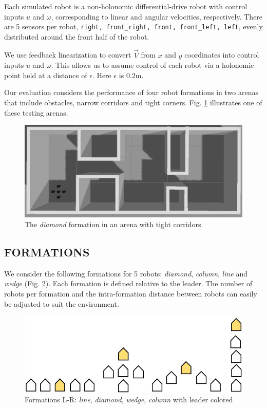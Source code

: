 \documentclass[letterpaper, 10 pt, conference]{ieeeconf}  %
\begin{document}
Each simulated robot is a non-holonomic differential-drive robot with control inputs $u$ and $\omega$, corresponding to linear and angular velocities, respectively. There are 5 sensors per robot, \texttt{right, front\_right, front, front\_left, left}, evenly distributed around the front half of the robot.

We use feedback linearization to convert $\vec{V}$ from $x$ and $y$ coordinates into control inputs $u$ and $\omega$. This allows us to assume control of each robot via a holonomic point held at a distance of $\epsilon$. Here $\epsilon$ is 0.2m.

Our evaluation considers the performance of four robot formations in two arenas that include obstacles, narrow corridors and tight corners. Fig. \ref{corridorworld} illustrates one of these testing arenas.

\begin{figure}[thpb]
\centering
\includegraphics[width=\linewidth]{images/corridorworld.png}
\caption{The \textit{diamond} formation in an arena with tight corridors}
\label{corridorworld}
\end{figure}

\subsection{FORMATIONS}

We consider the following formations for 5 robots: \textit{diamond}, \textit{column}, \textit{line} and \textit{wedge} (Fig. \ref{formation_shapes}). Each formation is defined relative to the leader. The number of robots per formation and the intra-formation distance between robots can easily be adjusted to suit the environment.

\begin{figure}[thpb]
\centering
\includegraphics[width=0.7\linewidth]{images/formation_shapes.jpg}
\caption{Formations L-R: \textit{line}, \textit{diamond}, \textit{wedge}, \textit{column} with leader colored}
\label{formation_shapes}
\end{figure}
\end{document}
